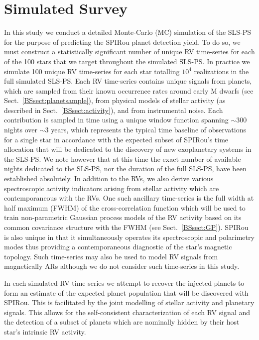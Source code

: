 \section{Simulated Survey} \label{BSsect:survey}
In this study we conduct a detailed Monte-Carlo (MC) simulation of the SLS-PS for the purpose of
predicting the SPIRou planet detection yield. To do so, we must construct a statistically significant
number of unique RV time-series for each of the 100 stars that we target throughout the simulated SLS-PS.
In practice we simulate 100 unique RV time-series for each star totalling $10^4$ realizations in the full
simulated SLS-PS. Each RV time-series contains unique signals from planets, which are sampled from their
known occurrence rates around early M dwarfs (see Sect.~\ref{BSsect:planetsample}), from physical models
of stellar activity (as described in Sect.~\ref{BSsect:activity}), and from instrumental noise.
Each contribution is sampled
in time using a unique window function spanning $\sim 300$ nights over $\sim 3$ years,
which represents the typical time baseline of observations for a single star
in accordance with the expected subset of SPIRou's time allocation that will be dedicated to the
discovery of new exoplanetary systems in the SLS-PS. We note however that at this time the exact number of available
nights dedicated to the SLS-PS, nor the duration of the full SLS-PS, have been established absolutely. In addition
to the RVs, we also derive various spectroscopic activity indicators arising from stellar activity
which are contemporaneous with the RVs. One such ancillary time-series is the full width at half maximum
(FWHM) of the cross-correlation function which will be used to
train non-parametric Gaussian process models of the RV activity based on its common covariance structure with
the FWHM (see Sect.~\ref{BSsect:GP}). SPIRou is also unique in that it simultaneously operates its spectroscopic and
polarimetry modes thus providing a contemporaneous diagnostic of the star's magnetic topology. Such time-series
may also
be used to model RV signals from magnetically ARs \citep{hebrard16} although we do not consider
such time-series in this study. 

In each
simulated RV time-series we attempt to recover the injected planets to form an estimate of the expected
planet population that will be discovered with SPIRou. This is facilitated by the joint modelling of stellar
activity and planetary signals. This allows for the self-consistent characterization of each RV signal and the
detection of a subset of planets which are nominally hidden by their host star's intrinsic RV activity.


